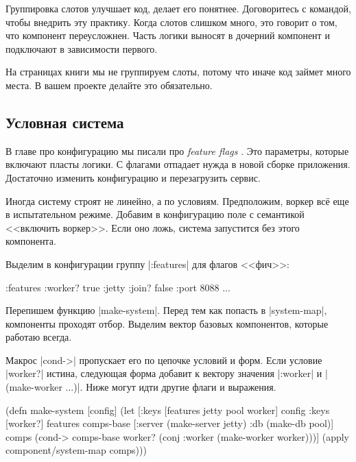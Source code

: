 Группировка слотов улучшает код, делает его понятнее. Договоритесь с командой,
чтобы внедрить эту практику. Когда слотов слишком много, это говорит о том, что
компонент переусложнен. Часть логики выносят в дочерний компонент и подключают в
зависимости первого.

На страницах книги мы не группируем слоты, потому что иначе код займет много
места. В вашем проекте делайте это обязательно.

\subsection{Условная система}

В главе про конфигурацию мы писали про \emph{feature flags} .
Это параметры, которые включают пласты логики. С флагами отпадает нужда в новой сборке
приложения. Достаточно изменить конфигурацию и перезагрузить сервис.

Иногда систему строят не линейно, а по условиям. Предположим, воркер
вс\"{е} еще в испытательном режиме. Добавим в конфигурацию поле с семантикой
<<включить воркер>>. Если оно ложь, система запустится без этого компонента.

Выделим в конфигурации группу \spverb|:features| для флагов <<фич>>:

\begin{english}
  \begin{clojure}
{:features {:worker? true}
 :jetty {:join? false :port 8088}
 ...}
  \end{clojure}
\end{english}

Перепишем функцию \spverb|make-system|. Перед тем как попасть в
\spverb|system-map|, компоненты проходят отбор. Выделим вектор базовых
компонентов, которые работаю всегда.

Макрос \spverb|cond->| пропускает его по цепочке условий и форм. Если условие
\spverb|worker?| истина, следующая форма добавит к вектору значения
\spverb|:worker| и \spverb|(make-worker {...})|. Ниже могут идти другие флаги и
выражения.

\begin{english}
  \begin{clojure}
(defn make-system [config]
  (let [{:keys [features jetty pool worker]} config
        {:keys [worker?]} features
        comps-base [:server (make-server jetty)
                    :db (make-db pool)]
        comps (cond-> comps-base
                worker?
                (conj :worker (make-worker worker)))]
    (apply component/system-map comps)))
  \end{clojure}
\end{english}

